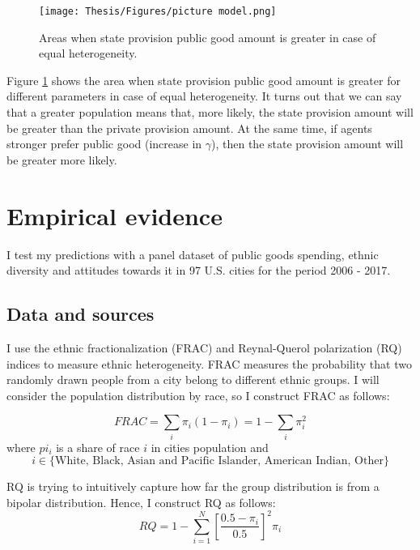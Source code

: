 \documentclass[12pt]{article}
\begin{document}
\begin{figure}[h!]
    \centering
    \texttt{[image: Thesis/Figures/picture model.png]}
    \caption{Areas when state provision public good amount is greater in case of equal heterogeneity.}
    \label{fig:param}
\end{figure}

Figure \ref{fig:param} shows the area when state provision public good amount is greater for different parameters in case of equal heterogeneity. It turns out that we can say that a greater population means that, more likely, the state provision amount will be greater than the private provision amount. At the same time, if agents stronger prefer public good (increase in $\gamma$), then the state provision amount will be greater more likely.


\section{Empirical evidence}
\label{sec: empirics}

I test my predictions with a panel dataset of
public goods spending, ethnic diversity and attitudes towards it in 97  U.S. cities for the period 2006 - 2017.

\subsection{Data and sources}

I use the ethnic fractionalization (FRAC) and Reynal-Querol polarization (RQ) indices to measure ethnic heterogeneity. FRAC measures the probability that two randomly drawn people from a city belong to different ethnic groups. I will consider the population distribution by race, so I construct FRAC as follows:

\begin{equation}
    FRAC = \sum_{i} \pi_i (1 - \pi_i) = 1 - \sum_{i}\pi_i^2
\end{equation}
where $pi_i$ is a share of race $i$ in cities population and
\[ i \in \{\text{White, Black, Asian and Pacific Islander, American Indian, Other} \} \]

RQ is trying to intuitively capture how far the group distribution is from a bipolar distribution. Hence, I construct RQ as follows:
\begin{equation}
    RQ=1-\sum_{i=1}^{N}\left[\frac{0.5-\pi_{i}}{0.5}\right]^{2} \pi_{i}
\end{equation}
\end{document}
